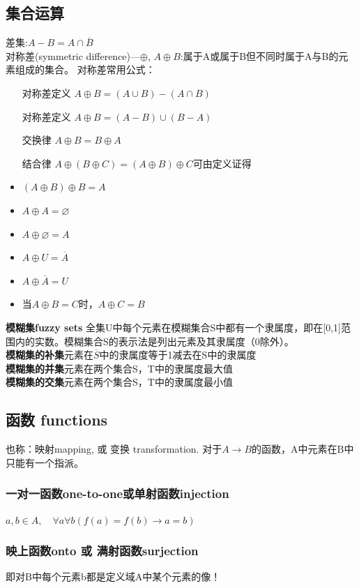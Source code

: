 \documentclass{article}
\begin{document}
    \subsection{集合运算}
    差集:$A-B = A \cap \overline{B}$\\
    对称差(symmetric difference)---$\oplus$, $A \oplus B$:属于A或属于B但不同时属于A与B的元素组成的集合。
    对称差常用公式：
    \begin{itemize}
        \item[对称差定义] $A\oplus B = (A\cup B)-(A \cap B)$
        \item[对称差定义] $A\oplus B = (A- B)\cup (B - A)$
        \item[交换律] $A \oplus B=B \oplus A$
        \item[结合律] $A \oplus(B \oplus C)=(A \oplus B) \oplus C$\quad 可由定义证得
        \item $(A \oplus B) \oplus B=A$
        \item $A \oplus A=\varnothing$
        \item $A \oplus \varnothing=A$
        \item $A \oplus U=\overline{A}$
        \item $A \oplus \overline{A}=U$
        \item 当$A\oplus B=C$时，$A\oplus C=B$
    \end{itemize}
    \textbf{模糊集fuzzy sets}
    全集U中每个元素在模糊集合S中都有一个隶属度，即在[0,1]范围内的实数。模糊集合S的表示法是列出元素及其隶属度（0除外）。
    \\
    \textbf{模糊集的补集}\quad 元素在$\overline{S}$中的隶属度等于1减去在S中的隶属度\\
    \textbf{模糊集的并集}\quad 元素在两个集合S，T中的隶属度最大值\\
    \textbf{模糊集的交集}\quad 元素在两个集合S，T中的隶属度最小值\\

    \subsection{函数 functions}
    也称：映射mapping, 或 变换 transformation. 对于$A\rightarrow B$的函数，A中元素在B中只能有一个指派。
    \subsubsection{一对一函数one-to-one或单射函数injection}
    $a, b \in A, \quad \forall a \forall b(f(a)=f(b) \rightarrow a=b)$
    \subsubsection{映上函数onto 或 满射函数surjection}
    即对B中每个元素b都是定义域A中某个元素的像！\\
\end{document}
